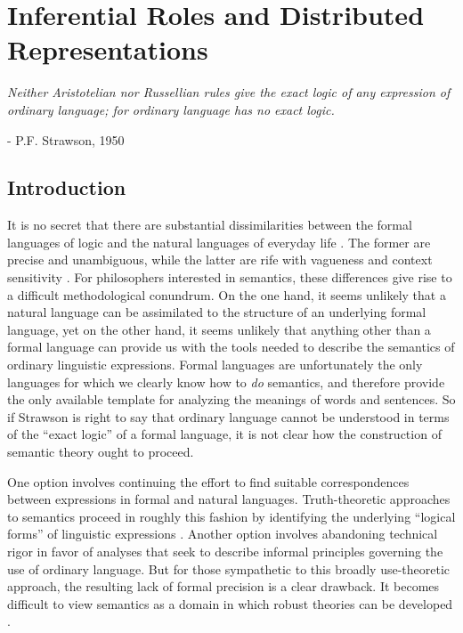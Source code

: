 
\chapter{Inferential Roles and Distributed Representations}
\renewcommand{\epigraphrule}{0pt}
\setlength{\epigraphwidth}{4.5in}
\epigraph{\textit{Neither Aristotelian nor Russellian rules give the exact logic of any expression of ordinary language; for ordinary language has no exact logic.}}{- P.F. Strawson, 1950}

\section{Introduction}

It is no secret that there are substantial dissimilarities between the formal languages of logic and the natural languages of everyday life \citep{Stanley:2008,Recanati:2012}. The former are precise and unambiguous, while the latter are rife with vagueness and context sensitivity \citep{Recanati:2012}. For philosophers interested in semantics, these differences give rise to a difficult methodological conundrum. On the one hand, it seems unlikely that a natural language can be assimilated to the structure of an underlying formal language, yet on the other hand, it seems unlikely that anything other than a formal language can provide us with the tools needed to describe the semantics of ordinary linguistic expressions. Formal languages are unfortunately the only languages for which we clearly know how to \textit{do}  semantics, and therefore provide the only available template for analyzing the meanings of words and sentences. So if Strawson is right to say that ordinary language cannot be understood in terms of the ``exact logic'' of a formal language, it is not clear how the construction of semantic theory ought to proceed. 

One option involves continuing the effort to find suitable correspondences between expressions in formal and natural languages. Truth-theoretic approaches to semantics proceed in roughly this fashion by identifying the underlying ``logical forms'' of linguistic expressions \citep{Soames:2010,Stanley:2008,Speaks:2014,Carpenter:1997}. Another option involves abandoning technical rigor in favor of analyses that seek to describe informal principles governing the use of ordinary language. But for those sympathetic to this broadly use-theoretic approach, the resulting lack of formal precision is a clear drawback. It becomes difficult to view semantics as a domain in which robust theories can be developed \citep[see][]{Wittgenstein:1953}. 


